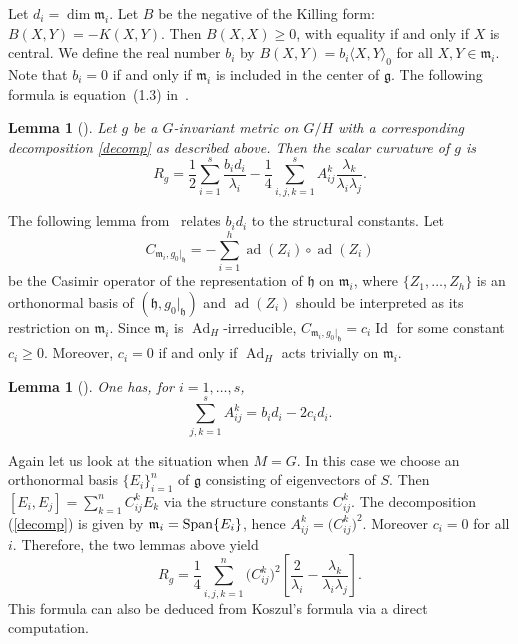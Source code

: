 \documentclass[pdftex]{sigma}
\newtheorem{Lemma}[Theorem]{Lemma}
 { \theoremstyle{definition}
\newtheorem{Definition}[Theorem]{Definition}
\newtheorem{Remark}[Theorem]{Remark} }
\begin{document}
Let $d_i=\dim \mathfrak{m}_i$. Let $B$ be the negative of the Killing form: $B(X, Y)=-K(X, Y)$. Then $B(X, X)\geq 0$, with equality if and only if $X$ is central. We define the real number $b_i$ by $B(X,Y)=b_i\langle X,Y\rangle_0$ for all $X,Y\in \mathfrak{m}_i$. Note that $b_i=0$ if and only if $\mathfrak{m}_i$ is included in the center of $\mathfrak{g}$. The following formula is equation~(1.3) in~\cite{12}.

\begin{Lemma}[{\cite[equation~(1.3)]{12}}] \label{wz1}
	Let $g$ be a $G$-invariant metric on $G/H$ with a corresponding decomposition
\eqref{decomp} as described above. Then the scalar curvature of $g$ is
	\begin{equation*} %
	R_g=\frac{1}{2} \sum_{i=1}^s \frac{b_id_i}{\lambda_i} - \frac{1}{4} \sum_{i, j, k=1}^s A^k_{ij} \frac{\lambda_{k}}{\lambda_i\lambda_{j}}.
	\end{equation*}
\end{Lemma}

The following lemma from~\cite{12} relates $b_id_i$ to the structural constants. Let
\[ C_{\mathfrak{m}_i, g_0|_{\mathfrak{h}}}= - \sum_{i=1}^h \operatorname{ad}(Z_i) \circ \operatorname{ad}(Z_i)\] be the Casimir operator of the representation of $\mathfrak{h}$ on $\mathfrak{m}_i$, where $\{Z_1, \dots, Z_h\}$ is an orthonormal basis of $(\mathfrak{h}, g_0|_{\mathfrak{h}})$ and $\operatorname{ad}(Z_i)$ should be interpreted as its restriction on $\mathfrak{m}_i$. Since $\mathfrak{m}_i$ is $\operatorname{Ad}_H$-irreducible, $C_{\mathfrak{m}_i, g_0|_{\mathfrak{h}}} =c_i \operatorname{Id}$ for some constant $c_i \geq 0$. Moreover, $c_i=0$ if and only if $\operatorname{Ad}_H$ acts trivially on $\mathfrak{m}_i$.
\begin{Lemma}[{\cite[Lemma 1.5]{16}}] \label{wz2}
	One has, for $i=1, \dots, s$,
	\begin{equation*} %
	\sum_{j,k=1}^s A^k_{ij}=b_id_i-2c_id_i.
	\end{equation*}
\end{Lemma}

\begin{Remark} \label{rflg}	Again let us look at the situation when $M=G$. In this case we choose an orthonormal basis $\{E_{i}\}_{i=1}^{n}$ of $\mathfrak{g}$ consisting of eigenvectors of $S$. Then $[E_{i},E_{j}]=\sum\limits_{k=1}^n C_{ij}^{k}E_k$ via the structure constants $C_{ij}^{k}$. The decomposition (\ref{decomp}) is given by $\mathfrak{m}_i={\rm Span}\{ E_i \}$, hence $A_{ij}^{k}=\big(C^k_{ij}\big)^2$. Moreover $c_i=0$ for all $i$. Therefore, the two lemmas above yield
\begin{equation} \label{ffsclg}
R_g= \frac{1}{4} \sum_{i, j, k=1}^n \big(C^k_{ij}\big)^2
\left[ \frac{2}{\lambda_i}- \frac{\lambda_{k}}{\lambda_i\lambda_{j}} \right].
\end{equation}
This formula can also be deduced from Koszul's formula via a direct computation.
\end{Remark}
\end{document}
